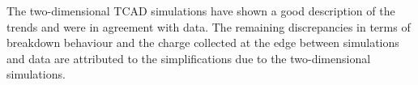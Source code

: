 The two-dimensional TCAD simulations have shown a good description of
the trends and were in agreement with data. The remaining
discrepancies in terms of breakdown behaviour and the charge collected
at the edge between simulations and data are attributed to the
simplifications due to the two-dimensional simulations.








